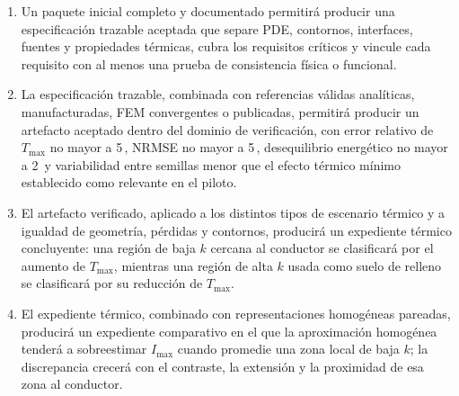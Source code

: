 \documentclass[11pt,a4paper,oneside]{report}
\newcommand{\Tmax}{T_{\max}}
\newcommand{\Imax}{I_{\max}}
\newcommand{\pct}{\mbox{\char37}}
\begin{document}
\begin{enumerate}[label=HE\arabic*.]
  \item Un paquete inicial completo y documentado permitirá producir una especificación trazable aceptada que separe PDE, contornos, interfaces, fuentes y propiedades térmicas, cubra los requisitos críticos y vincule cada requisito con al menos una prueba de consistencia física o funcional.
  \item La especificación trazable, combinada con referencias válidas analíticas, manufacturadas, FEM convergentes o publicadas, permitirá producir un artefacto aceptado dentro del dominio de verificación, con error relativo de $\Tmax$ no mayor a 5\,\pct{}, NRMSE no mayor a 5\,\pct{}, desequilibrio energético no mayor a 2\,\pct{} y variabilidad entre semillas menor que el efecto térmico mínimo establecido como relevante en el piloto.
  \item El artefacto verificado, aplicado a los distintos tipos de escenario térmico y a igualdad de geometría, pérdidas y contornos, producirá un expediente térmico concluyente: una región de baja $k$ cercana al conductor se clasificará por el aumento de $\Tmax$, mientras una región de alta $k$ usada como suelo de relleno se clasificará por su reducción de $\Tmax$.
  \item El expediente térmico, combinado con representaciones homogéneas pareadas, producirá un expediente comparativo en el que la aproximación homogénea tenderá a sobreestimar $\Imax$ cuando promedie una zona local de baja $k$; la discrepancia crecerá con el contraste, la extensión y la proximidad de esa zona al conductor.
\end{enumerate}
\end{document}
